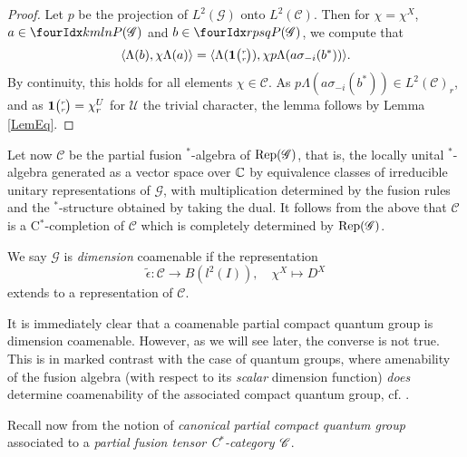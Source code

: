 \begin{proof} Let $p$ be the projection of $L^2(\mathscr{G})$ onto $L^2(\mathcal{C})$. Then for $\chi = \chi^X$, $a\in \Gr{P(\mathscr{G})}{k}{l}{m}{n}$ and $b\in \Gr{P(\mathscr{G})}{r}{s}{p}{q}$, we compute that \[\langle \Lambda(b),\chi \Lambda(a)\rangle =  \langle \Lambda( \mathbf{1}{\tiny {\begin{pmatrix} r\\r\end{pmatrix}}}),\chi p\Lambda(a\sigma_{-i}(b^*))\rangle.\] By continuity, this holds for all elements $\chi \in \mathcal{C}$. As $p\Lambda(a\sigma_{-i}(b^*)) \in L^2(\mathcal{C})_r$, and as $\mathbf{1}{\tiny {\begin{pmatrix} r\\r\end{pmatrix}}} = \chi^U_r$ for $\mathscr{U}$ the trivial character, the lemma follows by Lemma \ref{LemEq}.
\end{proof}

Let now $\mathscr{C}$ be the partial fusion $^*$-algebra of $\mathrm{Rep}(\mathscr{G})$, that is, the locally unital $^*$-algebra generated as a vector space over $\mathbb{C}$ by equivalence classes of irreducible unitary representations of $\mathscr{G}$, with multiplication determined by the fusion rules and the $^*$-structure obtained by taking the dual. It follows from the above that $\mathcal{C}$ is a C$^*$-completion of $\mathscr{C}$ which is completely determined by $\mathrm{Rep}(\mathscr{G})$.


\begin{Def} We say $\mathscr{G}$ is \emph{dimension} coamenable %
if the representation \[\tilde{\epsilon}: \mathscr{C} \rightarrow B(l^2(I)), \quad \chi^X \mapsto D^X\] extends to a representation of $\mathcal{C}$.
\end{Def}

It is immediately clear that a coamenable partial compact quantum group is dimension coamenable. However, as we will see later, the converse is not true. This is in marked contrast with the case of quantum groups, where amenability of the fusion algebra (with respect to its \emph{scalar} dimension function) \emph{does} determine coamenability of the associated compact quantum group, cf. \cite[Theorem 4.5]{Kye1}.
 

Recall now from \cite[Definition 1.23 and Section 4.1]{DCT1} the notion of \emph{canonical partial compact quantum group} associated to a \emph{partial fusion tensor C$^*$-category $\mathscr{C}$}.

